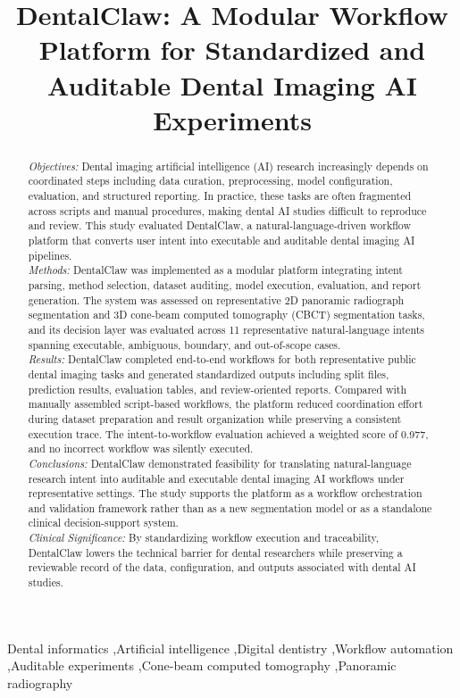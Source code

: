 \documentclass[final,5p,times,twocolumn]{elsarticle}
\begin{document}
\begin{frontmatter}

\title{DentalClaw: A Modular Workflow Platform for Standardized and Auditable Dental Imaging AI Experiments}

\begin{abstract}
\textit{Objectives:} Dental imaging artificial intelligence (AI) research increasingly depends on coordinated steps including data curation, preprocessing, model configuration, evaluation, and structured reporting. In practice, these tasks are often fragmented across scripts and manual procedures, making dental AI studies difficult to reproduce and review. This study evaluated DentalClaw, a natural-language-driven workflow platform that converts user intent into executable and auditable dental imaging AI pipelines.\\
\textit{Methods:} DentalClaw was implemented as a modular platform integrating intent parsing, method selection, dataset auditing, model execution, evaluation, and report generation. The system was assessed on representative 2D panoramic radiograph segmentation and 3D cone-beam computed tomography (CBCT) segmentation tasks, and its decision layer was evaluated across 11 representative natural-language intents spanning executable, ambiguous, boundary, and out-of-scope cases.\\
\textit{Results:} DentalClaw completed end-to-end workflows for both representative public dental imaging tasks and generated standardized outputs including split files, prediction results, evaluation tables, and review-oriented reports. Compared with manually assembled script-based workflows, the platform reduced coordination effort during dataset preparation and result organization while preserving a consistent execution trace. The intent-to-workflow evaluation achieved a weighted score of 0.977, and no incorrect workflow was silently executed.\\
\textit{Conclusions:} DentalClaw demonstrated feasibility for translating natural-language research intent into auditable and executable dental imaging AI workflows under representative settings. The study supports the platform as a workflow orchestration and validation framework rather than as a new segmentation model or as a standalone clinical decision-support system.\\
\textit{Clinical Significance:} By standardizing workflow execution and traceability, DentalClaw lowers the technical barrier for dental researchers while preserving a reviewable record of the data, configuration, and outputs associated with dental AI studies.
\end{abstract}

\begin{keyword}
Dental informatics \sep Artificial intelligence \sep Digital dentistry \sep Workflow automation \sep Auditable experiments \sep Cone-beam computed tomography \sep Panoramic radiography
\end{keyword}

\end{frontmatter}
\end{document}
